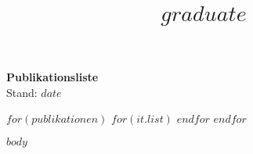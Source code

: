 \documentclass[a4paper,%
            11pt] %
            {moderncv} %
\title{$graduate$}
\begin{document}
\makecvtitle
\begin{center}
\Huge \textbf{Publikationsliste}\normalsize\\[2mm] Stand: $date$
\end{center}
\bigskip
\nocite{*}

$for(publikationen)$
$for(it.list)$
\printbibliography[keyword={$it.key$}, title={$it.title$}]
$endfor$
$endfor$

$body$
\end{document}
